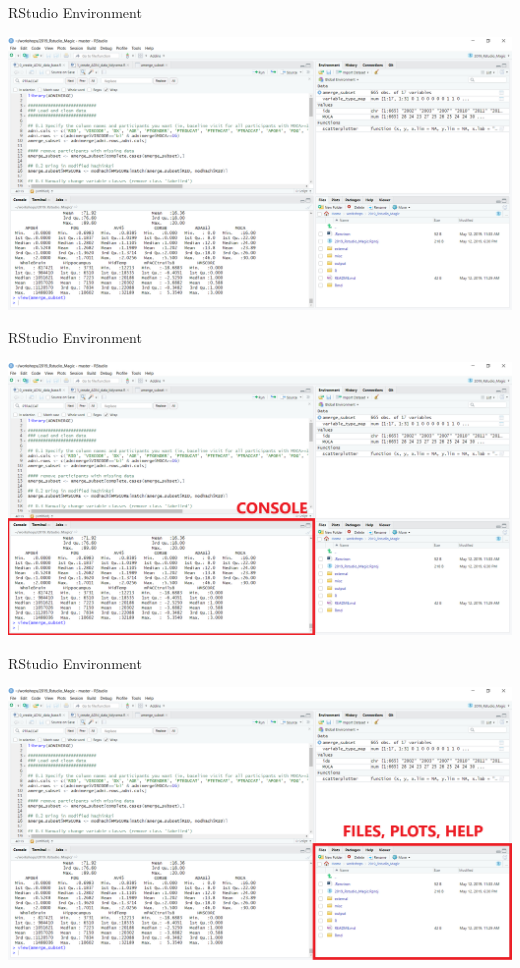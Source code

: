 \documentclass[
  ignorenonframetext,
]{beamer}
\begin{document}
\begin{frame}{RStudio Environment}
\protect\hypertarget{rstudio-environment}{}

\includegraphics{../external/images/rstudio_0_terminal_code.PNG}

\end{frame}

\begin{frame}{RStudio Environment}
\protect\hypertarget{rstudio-environment-1}{}

\includegraphics{../external/images/rstudio_terminal_1_CONSOLE.png}

\end{frame}

\begin{frame}{RStudio Environment}
\protect\hypertarget{rstudio-environment-2}{}

\includegraphics{../external/images/rstudio_terminal_2_FILES.png}

\end{frame}
\end{document}
